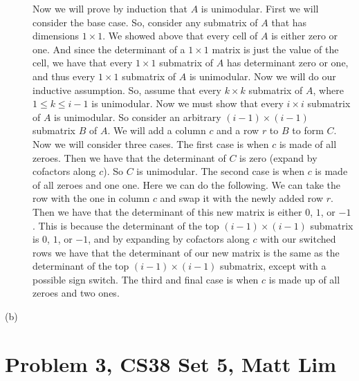 \documentclass{article}
\begin{document}
\begin{description}
        Now we will prove by induction that $A$ is unimodular.
        First we will consider the base case. So, consider any submatrix of $A$
        that has dimensions $1 \times 1$. We showed above that every cell of $A$
        is either zero or one. And since the determinant of a $1 \times 1$
        matrix is just the value of the cell, we have that every $1 \times 1$
        submatrix of $A$ has determinant zero or one, and thus every $1 \times
        1$ submatrix of $A$ is unimodular. Now we will do our inductive
        assumption. So, assume that every $k \times k$ submatrix of
        $A$, where $1 \le k \le i - 1$ is unimodular. Now we must show that every $i \times i$ submatrix of
        $A$ is unimodular. So consider an arbitrary $(i - 1) \times (i - 1)$
        submatrix $B$ of $A$. We will add a column $c$ and a row $r$ to $B$ to
        form $C$. Now
        we will consider three cases. The first case is when $c$ is made of all
        zeroes. Then we have that the determinant of $C$ is zero (expand by
        cofactors along $c$). So $C$ is unimodular. The second case is when $c$ is made of
        all zeroes and one one. Here we can do the following. We can take the
        row with the one in column $c$ and swap it with the newly added row $r$.
        Then we have that the determinant of this new matrix is either $0$, $1$,
        or $-1$. This is because the determinant of the top $(i - 1) \times (i -
        1)$ submatrix is $0$, $1$, or $-1$, and by expanding by cofactors along
        $c$
        with our switched rows we have that the determinant of our new matrix is
        the same as the determinant of the top $(i - 1) \times (i - 1)$
        submatrix, except with a possible sign switch. The third and final case
        is when $c$ is made up of all zeroes and two ones.
    \item[(b)]
\end{description}
\newpage

\section*{Problem 3, CS38 Set 5, Matt Lim}
\newpage

\end{document}
